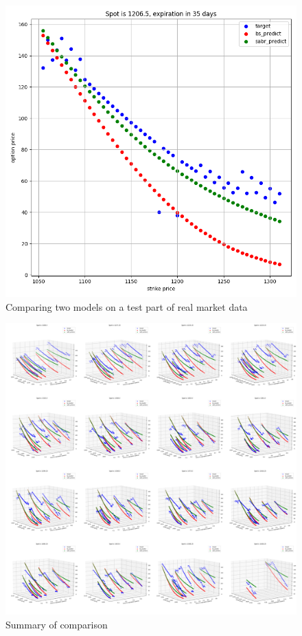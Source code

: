 \documentclass[a4paper,fleqn,12pt]{extarticle}
\begin{document}
	\begin{figure}[ht]
		\centering
		\includegraphics[width=1\textwidth]{pngs/2011-09-16-35.png}
		\caption{Comparing two models on a test part of real market data}
	\end{figure}
	\begin{figure}[ht]
		\centering
		\includegraphics[width=1\textwidth]{pngs/summary.png}
		\caption{Summary of comparison}
	\end{figure}
\end{document}
